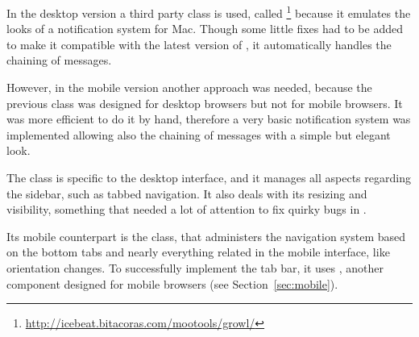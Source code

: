 In the desktop version a third party  class is used, called \footnote{\url{http://icebeat.bitacoras.com/mootools/growl/}} because it emulates the looks of a notification system for Mac.
Though some little fixes had to be added to make it compatible with the latest version of , it automatically handles the chaining of messages.

However, in the mobile version another approach was needed, because the previous class was designed for desktop browsers but not for mobile browsers.
It was more efficient to do it by hand, therefore a very basic notification system was implemented allowing also the chaining of messages with a simple but elegant look.

The  class is specific to the desktop interface, and it manages all aspects regarding the sidebar, such as tabbed navigation.
It also deals with its resizing and visibility, something that needed a lot of attention to fix quirky bugs in .

Its mobile counterpart is the  class, that administers the navigation system based on the bottom tabs and nearly everything related in the mobile interface, like orientation changes.
To successfully implement the tab bar, it uses , another  component designed for  mobile browsers (see Section~\ref{sec:mobile}).
